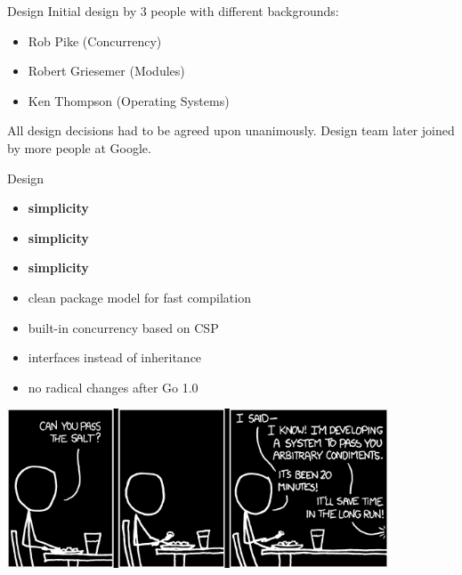 \documentclass[10pt]{beamer}
\begin{document}
	\begin{frame}{Design}
		Initial design by 3 people with different backgrounds:
		\begin{itemize}
			\item Rob Pike (Concurrency)
			\item Robert Griesemer (Modules)
			\item Ken Thompson (Operating Systems)
		\end{itemize}
		All design decisions had to be agreed upon unanimously.
		Design team later joined by more people at Google.
	\end{frame}
	
	
	\begin{frame}{Design}
		\begin{itemize}
			\item \textbf{simplicity}
			\item \textbf{simplicity}
			\item \textbf{simplicity}
			\item clean package model for fast compilation
			\item built-in concurrency based on CSP
			\item interfaces instead of inheritance
			\item no radical changes after Go 1.0
		\end{itemize}
	\end{frame}
	
	
	\begin{frame}
		\begin{center}
			\includegraphics[width=0.85\textwidth]{images/the_general_problem-inv}
		\end{center}
	\end{frame}
	
	
\end{document}
